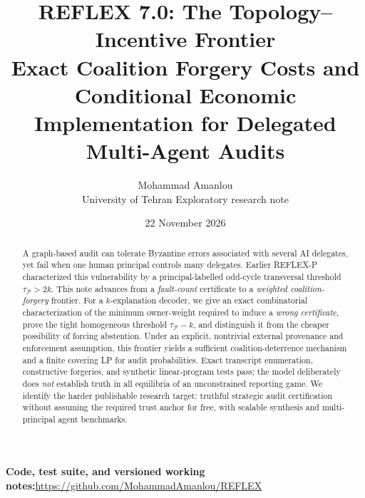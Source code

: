 \documentclass[10pt,a4paper]{article}
\title{\vspace{-1.0cm}\color{navy}\textbf{REFLEX 7.0: The Topology--Incentive Frontier}\\[3pt]
\large Exact Coalition Forgery Costs and Conditional Economic Implementation for Delegated Multi-Agent Audits}
\author{Mohammad Amanlou\\\small University of Tehran \textbar{} Exploratory research note}
\date{22 November 2026}
\newcommand{\Pc}{\mathcal P}
\begin{document}
\maketitle
\vspace{-0.8cm}
\begin{center}
\footnotesize\color{teal}\textbf{Code, test suite, and versioned working notes:}\quad \url{https://github.com/MohammadAmanlou/REFLEX}
\end{center}
\noindent{}
\vspace{6pt}

\begin{abstract}
A graph-based audit can tolerate Byzantine errors associated with several AI delegates, yet fail when one human principal controls many delegates. Earlier REFLEX-P characterized this vulnerability by a principal-labelled odd-cycle transversal threshold $\tau_\Pc>2k$. This note advances from a \emph{fault-count} certificate to a \emph{weighted coalition-forgery} frontier. For a $k$-explanation decoder, we give an exact combinatorial characterization of the minimum owner-weight required to induce a \emph{wrong certificate}, prove the tight homogeneous threshold $\tau_\Pc-k$, and distinguish it from the cheaper possibility of forcing abstention. Under an explicit, nontrivial external provenance and enforcement assumption, this frontier yields a sufficient coalition-deterrence mechanism and a finite covering LP for audit probabilities. Exact transcript enumeration, constructive forgeries, and synthetic linear-program tests pass; the model deliberately does \emph{not} establish truth in all equilibria of an unconstrained reporting game. We identify the harder publishable research target: truthful strategic audit certification without assuming the required trust anchor for free, with scalable synthesis and multi-principal agent benchmarks.
\end{abstract}
\end{document}
